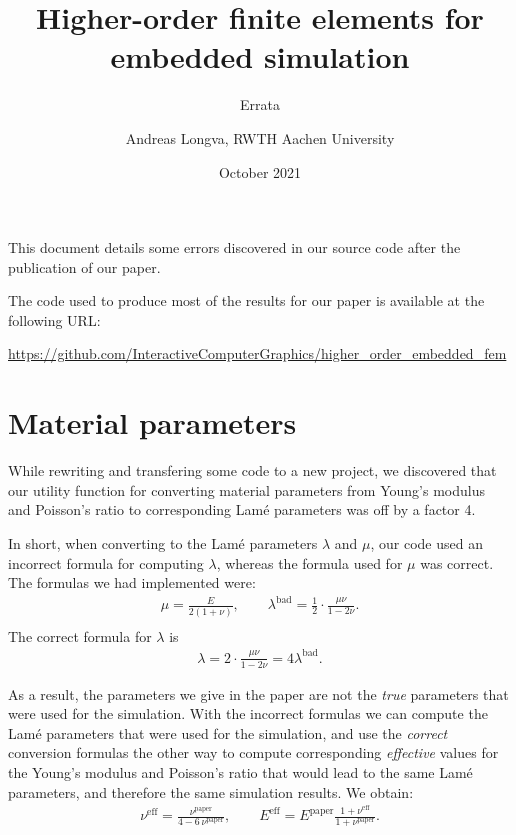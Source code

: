 \documentclass{scrartcl}
\title{Higher-order finite elements for embedded simulation}
\subtitle{Errata}
\date{October 2021}
\author{Andreas Longva, RWTH Aachen University}
\begin{document}
\maketitle

This document details some errors discovered in our source code after the publication of our paper.

The code used to produce most of the results for our paper is available at the following URL:

\begin{center}
\url{https://github.com/InteractiveComputerGraphics/higher_order_embedded_fem}
\end{center}

\section*{Material parameters}
While rewriting and transfering some code to a new project, we discovered that our utility function for converting material parameters from Young's modulus and Poisson's ratio to corresponding Lamé parameters was off by a factor 4.

In short, when converting to the Lamé parameters $\lambda$ and $\mu$, our code used an incorrect formula for computing $\lambda$, whereas the formula used for $\mu$ was correct. The formulas we had implemented were:
\begin{align*}
\mu = \frac{E}{2 (1 + \nu)}, \qquad
\lambda^\text{bad} = \frac{1}{2} \cdot \frac{\mu \nu}{1 - 2 \nu}. \\
\end{align*}
The correct formula for $\lambda$ is
\begin{align*}
\lambda = 2 \cdot \frac{\mu \nu}{1 - 2 \nu} = 4 \lambda^\text{bad}.
\end{align*}

As a result, the parameters we give in the paper are not the \emph{true} parameters that were used for the simulation. With the incorrect formulas we can compute the Lamé parameters that were used for the simulation, and use the \emph{correct} conversion formulas the other way to compute corresponding \emph{effective} values for the Young's modulus and Poisson's ratio that would lead to the same Lamé parameters, and therefore the same simulation results. We obtain:
\begin{align*}
\nu^\text{eff} = \frac{\nu^\text{paper}}{4 - 6 \, \nu^\text{paper}},
\qquad
E^\text{eff} = E^\text{paper} \frac{1 + \nu^\text{eff}}{1 + \nu^\text{paper}}.
\end{align*}
\end{document}
